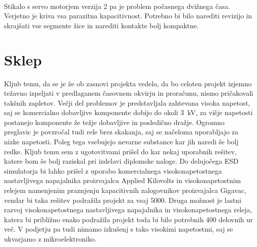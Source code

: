 \documentclass[a4paper,twoside,openright,12pt,Slovene]{book}
\begin{document}
    ~\\Stikalo s servo motorjem verzija 2 pa je problem počasnega dvižnega časa. Verjetno je kriva vsa parazitna kapacitivnost. Potrebno bi bilo narediti revizijo in skrajšati vse segmente žice in narediti kontakte bolj kompaktne. 
    





\chapter{Sklep} \label{Sklep}

	Kljub temu, da se je že ob zasnovi projekta vedelo, da bo celoten projekt izjemno težavno izpeljati v predlaganem časovnem okvirju in proračunu, nismo pričakovali takšnih zapletov. Večji del problemov je predstavljala zahtevana visoka napetost, saj se komercialno dobavljive komponente dobijo do okoli \SI{3}{\kilo\volt}, za višje napetosti postanejo komponente že težje dobavljive in posledično dražje. Ogromno preglavic je povzročal tudi rele brez skakanja, saj se načeloma uporabljajo za nizke napetosti. Poleg tega vsebujejo nevarne substance kar jih naredi še bolj redke. Kljub temu sem z ugotovitvami prišel do kar nekaj uporabnih rešitev, katere bom še bolj raziskal pri izdelavi diplomske naloge. Do delujočega ESD simulatorja bi lahko prišel z uporabo komercialnega visokonapetostnega nastavljivega napajalnika proizvajalca Applied Kilovolts in visokonapetostnim relejem namenjenim praznjenju kapacitivnih zalogovnikov proizvajalca Gigavac, vendar bi taka rešitev podražila projekt za vsaj 5000\texteuro. Druga možnost je lastni razvoj visokonapetostnega nastavljivega napajalnika in visokonapetostnega releja, katera bi približno enako podražila projekt toda bi bilo potrebnih 400 delovnih ur več. V podjetju pa tudi nimamo izkušenj s tako visokimi napetostmi, saj se ukvarjamo z mikroelektroniko.
	
	
	
	
 
\end{document}
